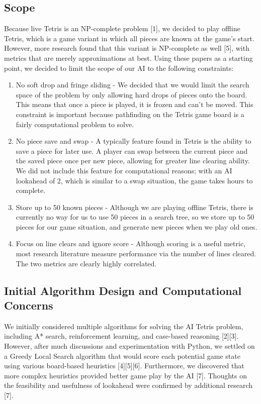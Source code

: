 \documentclass[12pt]{article}
\begin{document}
\subsection{Scope}
Because live Tetris is an NP-complete problem [1], we decided to play offline Tetris, which is a game variant in which all pieces are known at the game’s start. However, more research found that this variant is NP-complete as well [5], with metrics that are merely approximations at best. Using these papers as a starting point, we decided to limit the scope of our AI to the following constraints:
\begin{enumerate}
\item No soft drop and fringe sliding - We decided that we would limit the search space of the problem by only allowing hard drops of pieces onto the board. This means that once a piece is played, it is frozen and can’t be moved. This constraint is important because pathfinding on the Tetris game board is a fairly computational problem to solve.
\item No piece save and swap - A typically feature found in Tetris is the ability to save a piece for later use. A player can swap between the current piece and the saved piece once per new piece, allowing for greater line clearing ability. We did not include this feature for computational reasons; with an AI lookahead of 2, which is similar to a swap situation, the game takes hours to complete.
\item Store up to 50 known pieces - Although we are playing offline Tetris, there is currently no way for us to use 50 pieces in a search tree, so we store up to 50 pieces for our game situation, and generate new pieces when we play old ones.
\item Focus on line clears and ignore score - Although scoring is a useful metric, most research literature measure performance via the number of lines cleared. The two metrics are clearly highly correlated.
\end{enumerate}

\subsection{Initial Algorithm Design and Computational Concerns}
We initially considered multiple algorithms for solving the AI Tetris problem, including A* search, reinforcement learning, and case-based reasoning [2][3]. However, after much discussions and experimentation with Python, we settled on a Greedy Local Search algorithm that would score each potential game state using various board-based heuristics [4][5][6]. Furthermore, we discovered that more complex heuristics provided better game play by the AI [7]. Thoughts on the feasibility and usefulness of lookahead were confirmed by additional research [7]. 
\end{document}
